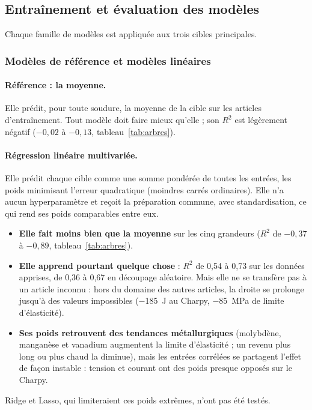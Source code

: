 
\subsection{Entraînement et évaluation des modèles}\label{sec:modeles}

Chaque famille de modèles est appliquée aux trois cibles principales.

\subsubsection{Modèles de référence et modèles linéaires}

\paragraph{Référence : la moyenne.} Elle prédit, pour toute soudure, la moyenne de la
cible sur les articles d'entraînement. Tout modèle doit faire mieux qu'elle ; son $R^2$
est légèrement négatif ($-0{,}02$ à $-0{,}13$, tableau~\ref{tab:arbres}).

\paragraph{Régression linéaire multivariée.} Elle prédit chaque cible comme une somme
pondérée de toutes les entrées, les poids minimisant l'erreur quadratique (moindres
carrés ordinaires). Elle n'a aucun hyperparamètre et reçoit la préparation commune, avec
standardisation, ce qui rend ses poids comparables entre eux.
\begin{itemize}
  \item \textbf{Elle fait moins bien que la moyenne} sur les cinq grandeurs ($R^2$ de
    $-0{,}37$ à $-0{,}89$, tableau~\ref{tab:arbres}).
  \item \textbf{Elle apprend pourtant quelque chose} : $R^2$ de 0,54 à 0,73 sur les données
    apprises, de 0,36 à 0,67 en découpage aléatoire. Mais elle ne se transfère pas à un
    article inconnu : hors du domaine des autres articles, la droite se prolonge jusqu'à
    des valeurs impossibles (\SI{-185}{\joule} au Charpy, \SI{-85}{\mega\pascal} de limite
    d'élasticité).
  \item \textbf{Ses poids retrouvent des tendances métallurgiques} (molybdène, manganèse et
    vanadium augmentent la limite d'élasticité ; un revenu plus long ou plus chaud la
    diminue), mais les entrées corrélées se partagent l'effet de façon instable : tension
    et courant ont des poids presque opposés sur le Charpy.
\end{itemize}
Ridge et Lasso, qui limiteraient ces poids extrêmes, n'ont pas été testés.

